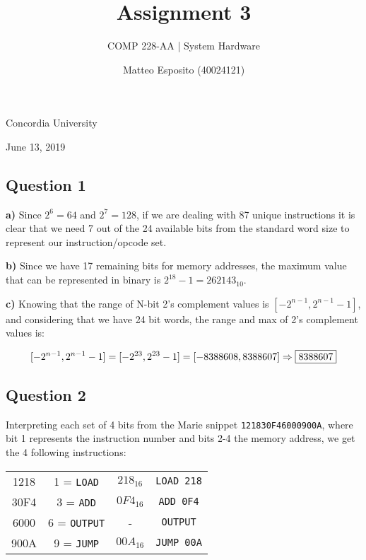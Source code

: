 \documentclass[a4paper,12pt]{article}
\title{\textbf{Assignment 3}}
\author{COMP 228-AA | System Hardware}
\date{Matteo Esposito (40024121)}
\def\code#1{\texttt{#1}}
\begin{document}
\begin{titlingpage}
  \maketitle
  \centering
  \vfill
  {\large{Concordia University}}\par
  {\large{June 13, 2019}}
\end{titlingpage}

\newpage

\subsection*{Question 1}

\textbf{a)} Since $2^6 = 64$ and $2^7 = 128$, if we are dealing with 87 unique instructions it is clear that we need 7 out of the 24 available bits from the standard word size to represent our instruction/opcode set.

\textbf{b)} Since we have 17 remaining bits for memory addresses, the maximum value that can be represented in binary is $2^{18}-1 = 262143_{10}$.

\textbf{c)} Knowing that the range of N-bit 2's complement values is $[-2^{n-1}, 2^{n-1}-1]$, and considering that we have 24 bit words, the range and max of 2's complement values is: 

$$[-2^{n-1}, 2^{n-1}-1] = [-2^{23}, 2^{23}-1] = [-8388608, 8388607] \Rightarrow \fbox{8388607}$$

\subsection*{Question 2}

Interpreting each set of 4 bits from the Marie snippet \code{121830F46000900A}, where bit 1 represents the instruction number and bits 2-4 the memory address, we get the 4 following instructions:

\begin{table}[H]
    \centering
    \begin{tabular}{|c|c|c|c|}
        \hline
        \text{\textbf{Hex}} & \text{\textbf{Opcode}} & \text{\textbf{Address}} & \text{\textbf{Instruction}} \\ \hline
        1218 & 1 = \code{LOAD} & $218_{16}$ & \code{LOAD 218} \\ \hline
        30F4 & 3 = \code{ADD} & $0F4_{16}$ & \code{ADD 0F4} \\ \hline
        6000 & 6 = \code{OUTPUT} & - & \code{OUTPUT} \\ \hline
        900A & 9 = \code{JUMP} & $00A_{16}$ & \code{JUMP 00A} \\ \hline
    \end{tabular}
\end{table}
\end{document}

